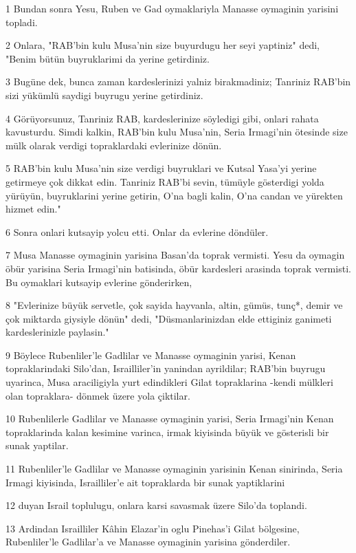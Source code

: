 \par 1 Bundan sonra Yesu, Ruben ve Gad oymaklariyla Manasse oymaginin yarisini topladi.
\par 2 Onlara, "RAB'bin kulu Musa'nin size buyurdugu her seyi yaptiniz" dedi, "Benim bütün buyruklarimi da yerine getirdiniz.
\par 3 Bugüne dek, bunca zaman kardeslerinizi yalniz birakmadiniz; Tanriniz RAB'bin sizi yükümlü saydigi buyrugu yerine getirdiniz.
\par 4 Görüyorsunuz, Tanriniz RAB, kardeslerinize söyledigi gibi, onlari rahata kavusturdu. Simdi kalkin, RAB'bin kulu Musa'nin, Seria Irmagi'nin ötesinde size mülk olarak verdigi topraklardaki evlerinize dönün.
\par 5 RAB'bin kulu Musa'nin size verdigi buyruklari ve Kutsal Yasa'yi yerine getirmeye çok dikkat edin. Tanriniz RAB'bi sevin, tümüyle gösterdigi yolda yürüyün, buyruklarini yerine getirin, O'na bagli kalin, O'na candan ve yürekten hizmet edin."
\par 6 Sonra onlari kutsayip yolcu etti. Onlar da evlerine döndüler.
\par 7 Musa Manasse oymaginin yarisina Basan'da toprak vermisti. Yesu da oymagin öbür yarisina Seria Irmagi'nin batisinda, öbür kardesleri arasinda toprak vermisti. Bu oymaklari kutsayip evlerine gönderirken,
\par 8 "Evlerinize büyük servetle, çok sayida hayvanla, altin, gümüs, tunç*, demir ve çok miktarda giysiyle dönün" dedi, "Düsmanlarinizdan elde ettiginiz ganimeti kardeslerinizle paylasin."
\par 9 Böylece Rubenliler'le Gadlilar ve Manasse oymaginin yarisi, Kenan topraklarindaki Silo'dan, Israilliler'in yanindan ayrildilar; RAB'bin buyrugu uyarinca, Musa araciligiyla yurt edindikleri Gilat topraklarina -kendi mülkleri olan topraklara- dönmek üzere yola çiktilar.
\par 10 Rubenlilerle Gadlilar ve Manasse oymaginin yarisi, Seria Irmagi'nin Kenan topraklarinda kalan kesimine varinca, irmak kiyisinda büyük ve gösterisli bir sunak yaptilar.
\par 11 Rubenliler'le Gadlilar ve Manasse oymaginin yarisinin Kenan sinirinda, Seria Irmagi kiyisinda, Israilliler'e ait topraklarda bir sunak yaptiklarini
\par 12 duyan Israil toplulugu, onlara karsi savasmak üzere Silo'da toplandi.
\par 13 Ardindan Israilliler Kâhin Elazar'in oglu Pinehas'i Gilat bölgesine, Rubenliler'le Gadlilar'a ve Manasse oymaginin yarisina gönderdiler.
